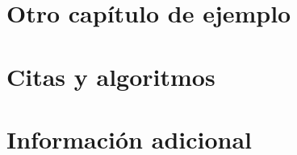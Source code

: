 \documentclass{tesislcc}
\begin{document}
\chapter{Otro capítulo de ejemplo}


\chapter{Citas y algoritmos}



\conclusiones


\appendix

\chapter{Información adicional}


\listoffigures

\listoftables

\listofalgorithms

\listoflistings

\nocite{*}

\end{document}

